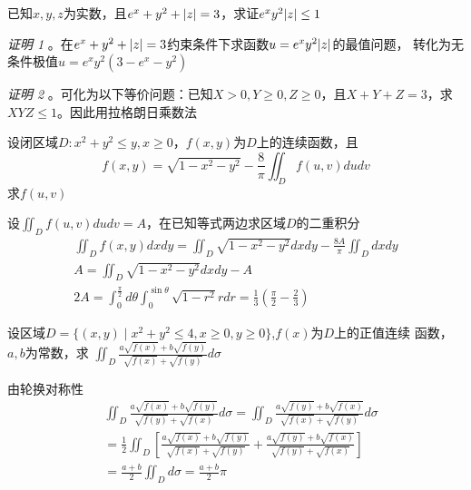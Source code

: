 \documentclass{article}
\begin{document}
\begin{examplle}[]
已知\(x,y,z\)为实数，且\(e^x+y^2+\abs{z}=3\)，求证\(e^xy^2\abs{z}\le1\)

\emph{证明 1} 。在\(e^x+y^2+\abs{z}=3\)约束条件下求函数\(u=e^xy^2\abs{z}\)的最值问题，
转化为无条件极值\(u=e^xy^2(3-e^x-y^2)\)

\emph{证明 2} 。可化为以下等价问题：已知\(X>0,Y\ge0,Z\ge0\)，且\(X+Y+Z=3\)，求
\(XYZ\le1\)。因此用拉格朗日乘数法
\end{examplle}

\begin{examplle}[]
设闭区域\(D:x^2+y^2\le y,x\ge0\)，\(f(x,y)\)为\(D\)上的连续函数，且
\begin{equation*}
f(x,y)=\sqrt{1-x^2-y^2}-\frac{8}{\pi}\iint_Df(u,v)dudv
\end{equation*}
求\(f(u,v)\)

设\(\iint_Df(u,v)dudv=A\)，在已知等式两边求区域\(D\)的二重积分
\begin{gather*}
\iint_Df(x,y)dxdy=\iint_D\sqrt{1-x^2-y^2}dxdy-\frac{8A}{\pi}\iint_Ddxdy\\
A=\iint_D\sqrt{1-x^2-y^2}dxdy-A\\
2A=\int^{\frac{\pi}{2}}_0d\theta\int_0^{\sin\theta}\sqrt{1-r^2}rdr=\frac{1}{3}(\frac{\pi}{2}-\frac{2}{3})
\end{gather*}
\end{examplle}

\begin{examplle}[]
设区域\(D=\{(x,y)\mid x^2+y^2\le4,x\ge0,y\ge0\}\),\(f(x)\)为\(D\)上的正值连续
函数，\(a,b\)为常数，求
\(\displaystyle\iint_D\frac{a\sqrt{f(x)}+b\sqrt{f(y)}}{\sqrt{f(x)}+\sqrt{f(y)}}d\sigma\)

由轮换对称性
\begin{align*}
&\iint_D\frac{a\sqrt{f(x)}+b\sqrt{f(y)}}{\sqrt{f(y)}+\sqrt{f(x)}}d\sigma=
\iint_D\frac{a\sqrt{f(y)}+b\sqrt{f(x)}}{\sqrt{f(x)}+\sqrt{f(y)}}d\sigma\\
&=\frac{1}{2}\iint_D\left[
\frac{a\sqrt{f(x)}+b\sqrt{f(y)}}{\sqrt{f(x)}+\sqrt{f(y)}}+
\frac{a\sqrt{f(y)}+b\sqrt{f(x)}}{\sqrt{f(y)}+\sqrt{f(x)}}
\right]\\
&=\frac{a+b}{2}\iint_Dd\sigma=\frac{a+b}{2}\pi
\end{align*}
\end{examplle}
\end{document}
